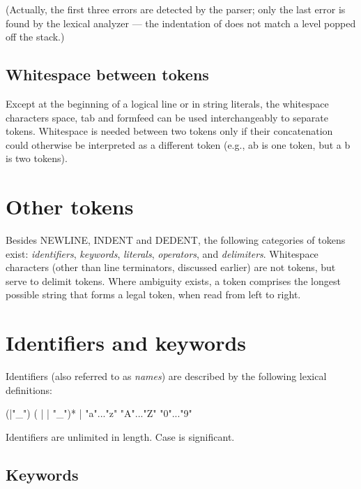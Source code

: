 (Actually, the first three errors are detected by the parser; only the
last error is found by the lexical analyzer --- the indentation of
 does not match a level popped off the stack.)


\subsection{Whitespace between tokens\label{whitespace}}

Except at the beginning of a logical line or in string literals, the
whitespace characters space, tab and formfeed can be used
interchangeably to separate tokens.  Whitespace is needed between two
tokens only if their concatenation could otherwise be interpreted as a
different token (e.g., ab is one token, but a b is two tokens).


\section{Other tokens\label{other-tokens}}

Besides NEWLINE, INDENT and DEDENT, the following categories of tokens
exist: \emph{identifiers}, \emph{keywords}, \emph{literals},
\emph{operators}, and \emph{delimiters}.
Whitespace characters (other than line terminators, discussed earlier)
are not tokens, but serve to delimit tokens.
Where
ambiguity exists, a token comprises the longest possible string that
forms a legal token, when read from left to right.


\section{Identifiers and keywords\label{identifiers}}

Identifiers (also referred to as \emph{names}) are described by the following
lexical definitions:

\begin{productionlist}
             {(|"_") ( |  | "_")*}
             { | }
             {"a"..."z"}
             {"A"..."Z"}
             {"0"..."9"}
\end{productionlist}

Identifiers are unlimited in length.  Case is significant.


\subsection{Keywords\label{keywords}}

